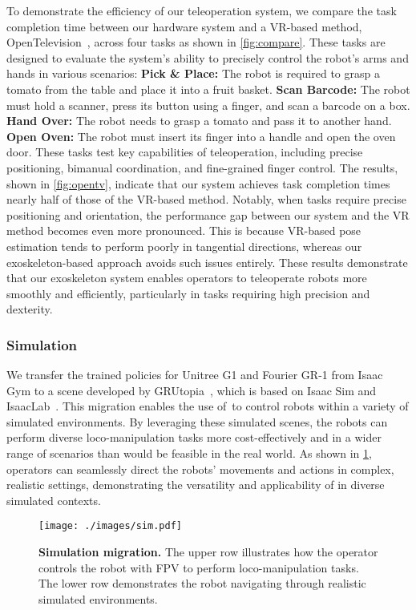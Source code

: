 To demonstrate the efficiency of our teleoperation system, we compare the task completion time between our hardware system and a VR-based method, OpenTelevision~\cite{cheng2024open}, across four tasks as shown in 
\cref{fig:compare}. These tasks are designed to evaluate the system's ability to precisely control the robot's arms and hands in various 
scenarios: \textbf{Pick \& Place:} The robot is required to grasp a tomato from the table and place it into a fruit basket. \textbf{Scan Barcode:} 
The robot must hold a scanner, press its button using a finger, and scan a barcode on a box. \textbf{Hand Over:} The robot needs to grasp a tomato and pass it to another hand. \textbf{Open Oven:} The robot must insert its finger into a handle and open the oven door. These tasks test key 
capabilities of teleoperation, including precise positioning, bimanual coordination, and fine-grained finger control. The results, shown in 
\cref{fig:opentv}, indicate that our system achieves task completion times nearly half of those of the VR-based method. Notably, when tasks require precise positioning and orientation, the performance gap between our system and the VR method becomes even more pronounced. This is because VR-based pose estimation tends to perform poorly in tangential directions, whereas our exoskeleton-based approach avoids such issues entirely. These results demonstrate that our exoskeleton system enables operators to 
teleoperate robots more smoothly and efficiently, particularly in tasks requiring high precision and dexterity.




\subsubsection{Simulation}
We transfer the trained policies for Unitree G1 and Fourier GR-1 from Isaac Gym to a scene developed by GRUtopia~\cite{wang2024grutopia}, which is based on Isaac Sim and IsaacLab~\cite{mittal2023orbit}. This migration enables the use of~\ourshort to control robots within a variety of simulated environments. By leveraging these simulated scenes, the robots can perform diverse loco-manipulation tasks more cost-effectively and in a wider range of scenarios than would be feasible in the real world. As shown in \cref{fig:grutopia}, operators can seamlessly direct the robots' movements and actions in complex, realistic settings, demonstrating the versatility and applicability of \ourshort in diverse simulated contexts.
\begin{figure}[!ht]
  \centering
  \texttt{[image: ./images/sim.pdf]}
  \caption{\textbf{Simulation migration.} The upper row illustrates how the operator controls the robot with FPV to perform loco-manipulation tasks. The lower row demonstrates the robot navigating through realistic simulated environments.}
  \label{fig:grutopia}
\end{figure}
